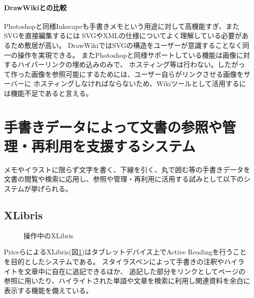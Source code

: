 \paragraph*{DrawWikiとの比較}
Photoshopと同様Inkscapeも手書きメモという用途に対して高機能すぎ、またSVGを直接編集するには
SVGやXMLの仕様についてよく理解している必要があるため敷居が高い。
DrawWikiではSVGの構造をユーザーが意識することなく同一の操作を実現できる。
またPhotoshopと同様サポートしている機能は画像に対するハイパーリンクの埋め込みのみで、
ホスティング等は行わない。したがって作った画像を参照可能にするためには、ユーザー自らがリンクさせる画像をサーバーに
ホスティングしなければならないため、Wikiツールとして活用するには機能不足であると言える。

\section{手書きデータによって文書の参照や管理・再利用を支援するシステム}
メモやイラストに限らず文字を書く、下線を引く、丸で囲む等の手書きデータを
文書の閲覧や検索に応用し、参照や管理・再利用に活用する試みとして以下のシステムが挙げられる。

\subsection{XLibris}
\begin{figure}[H]
    \centering
    \caption{操作中のXLibris}
    \label{fig:xlibris}
\end{figure}
PriceらによるXLibris\cite{Price1998XLibrisTA}(図\ref{fig:xlibris})はタブレットデバイス上でActive Readingを行うことを目的としたシステムである。
スタイラスペンによって手書きの注釈やハイライトを文章中に自在に追記できるほか、
追記した部分をリンクとしてページの参照に用いたり、ハイライトされた単語や文章を検索に利用し関連資料を余白に表示する機能を備えている。

